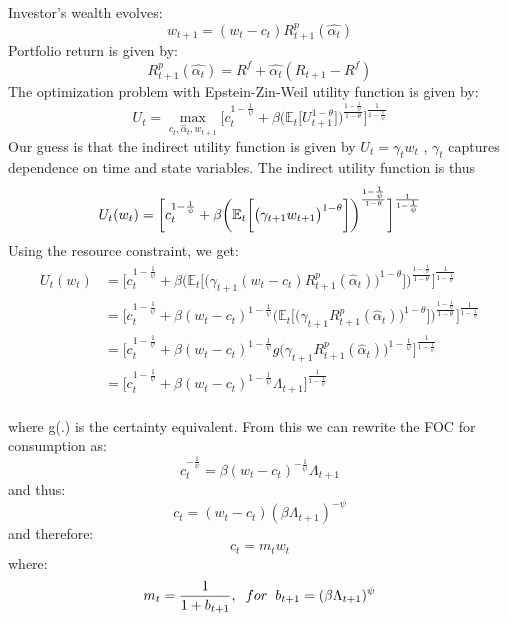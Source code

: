 \documentclass[12pt,a4paper]{article}
\begin{document}
Investor's wealth evolves:
\begin{equation*}
    w_{t+1}=(w_t-c_t)R^{p}_{t+1}(\hat{\alpha_t})
\end{equation*}
Portfolio return is given by:
\begin{equation*}
  R^{p}_{t+1}(\hat{\alpha_t})=R^f+ \hat{\alpha_t}(R_{t+1}-R^f)
\end{equation*}
The optimization problem with Epstein-Zin-Weil utility function is given by:
\begin{equation*}
    U_t=\max\limits_{c_{t},\hat{\alpha}_{t},w_{t+1}}\bigg[ c_t^{1-\frac{1}{\psi}}+ \beta\bigg(\mathbb{E}_t\bigg[U^{1-\theta}_{t+1}\bigg]\bigg)^{\frac{1-\frac{1}{\psi}}{1-\theta}}\bigg]^{\frac{1}{1-\frac{1}{\psi}}}
\end{equation*}
Our guess is that the indirect utility function is given by $U_t=\gamma_t w_t$
, $\gamma_t$ captures dependence on time and state variables.
The indirect utility function is thus
\begin{equation*}
   U_t(w_t) = \bigg[ c_t^{1-\frac{1}{\psi}}+\beta\bigg(\mathbb{E}_t\bigg[\big(\gamma_{t+1}w_{t+1}\big)^{1-\theta}\bigg]\bigg)^\frac{1-\frac{1}{\psi}}{1-\theta}\bigg]^\frac{1}{1-\frac{1}{\psi}}\\
\end{equation*}
Using the resource constraint, we get:
\begin{align*}
     U_t(w_t)&=\bigg[ c_t^{1-\frac{1}{\psi}}+\beta\bigg(\mathbb{E}_t\bigg[\big(\gamma_{t+1}(w_t-c_t)R^{p}_{t+1}(\hat{\alpha}_t)\big)^{1-\theta}\bigg]\bigg)^\frac{1-\frac{1}{\psi}}{1-\theta}\bigg]^\frac{1}{1-\frac{1}{\psi}}\\
     &=\bigg[ c_t^{1-\frac{1}{\psi}}+\beta(w_t-c_t)^{1-\frac{1}{\psi}}\bigg(\mathbb{E}_t\bigg[\big(\gamma_{t+1}R^{p}_{t+1}(\hat{\alpha}_t)\big)^{1-\theta}\bigg]\bigg)^\frac{1-\frac{1}{\psi}}{1-\theta}\bigg]^\frac{1}{1-\frac{1}{\psi}}\\
     &=\bigg[ c_t^{1-\frac{1}{\psi}}+\beta(w_t-c_t)^{1-\frac{1}{\psi}}g\big(\gamma_{t+1}R^{p}_{t+1}(\hat{\alpha}_t)\big)^{1-\frac{1}{\psi}}\bigg]^\frac{1}{1-\frac{1}{\psi}}\\
     &=\bigg[ c_t^{1-\frac{1}{\psi}}+\beta(w_t-c_t)^{1-\frac{1}{\psi}}\Lambda_{t+1}\bigg]^\frac{1}{1-\frac{1}{\psi}}\\
\end{align*}

where g(.) is the certainty equivalent. From this we can rewrite the FOC for consumption as:
\begin{equation*}
    c_t^{-\frac{1}{\psi}}=\beta(w_t-c_t)^{-\frac{1}{\psi}}\Lambda_{t+1}
\end{equation*}
and thus:
\begin{equation*}
    c_t=(w_t-c_t)(\beta\Lambda_{t+1})^{-\psi}
\end{equation*}
and therefore:
\begin{equation*}
    c_t=m_t w_t
\end{equation*}
where:
\begin{equation*}
    m_t=\frac{1}{1+b_{t+1}},\hspace{2mm} \text{$for$} \hspace{2mm} b_{t+1}=(\beta\Lambda_{t+1})^\psi
\end{equation*}
\end{document}
